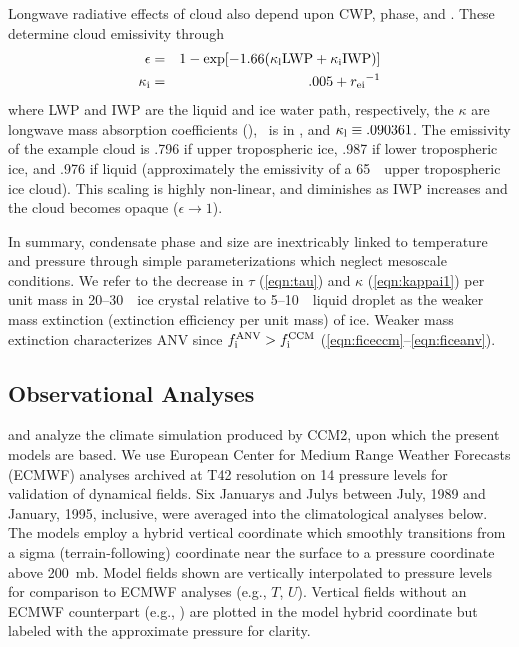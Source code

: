 \documentclass[agums]{aguplus}
\begin{document}
Longwave radiative effects of cloud also depend upon CWP, phase,
and \rdsffc. These determine cloud emissivity through
\begin{eqnarray}
\label{eqn:emissivity}
\epsilon & = & 1 - \exp[-1.66(\kappal \LWP + \kappai \IWP)] \\
\label{eqn:kappai1}
\kappai & = & .005 + \rei^{-1}
\end{eqnarray}
where LWP and IWP are the liquid and ice water path, respectively,
the $\kappa$ are longwave mass absorption coefficients (\mSxg), \rei\
is in \um, and $\mbox{$\kappa_\mathrm{l}$} \equiv .090361$. 
The emissivity of the example cloud is .796 if upper tropospheric ice,
.987 if lower tropospheric ice, and .976 if liquid (approximately the
emissivity of a 65~\gxmS\ upper tropospheric ice cloud).
This scaling is highly non-linear, and diminishes as IWP increases and
the cloud becomes opaque ($\epsilon \rightarrow 1$).

In summary, condensate phase and size are inextricably linked to 
temperature and pressure through simple parameterizations which
neglect mesoscale conditions. 
We refer to the decrease in $\tau$ (\ref{eqn:tau}) and $\kappa$
(\ref{eqn:kappai1}) per unit mass in 20--30~\um\ ice crystal relative
to 5--10~\um\ liquid droplet as the weaker mass extinction (extinction
efficiency per unit mass) of ice.
Weaker mass extinction characterizes ANV since $\mbox{$f_\mathrm{i}^\mathrm{ANV}$} > \mbox{$f_\mathrm{i}^\mathrm{CCM}$}$
(\ref{eqn:ficeccm}--\ref{eqn:ficeanv}).

\subsection{Observational Analyses}\label{sec:obs}

\cite{HBK94} and \cite{KHB94} analyze the climate simulation produced
by CCM2, upon which the present models are based.
We use European Center for Medium Range Weather Forecasts (ECMWF)
analyses archived at T42 resolution on 14 pressure levels
\cite[]{Tre92} for validation of dynamical fields.
Six Januarys and Julys between July, 1989 and January, 1995,
inclusive, were averaged into the climatological analyses below.
The models employ a hybrid vertical coordinate which smoothly
transitions from a sigma (terrain-following) coordinate near the
surface to a pressure coordinate above 200~mb.
Model fields shown are vertically interpolated to pressure levels for
comparison to ECMWF analyses (e.g., $T$, $U$).
Vertical fields without an ECMWF counterpart (e.g., \qc) are plotted
in the model hybrid coordinate but labeled with the approximate
pressure for clarity.
\end{document}
